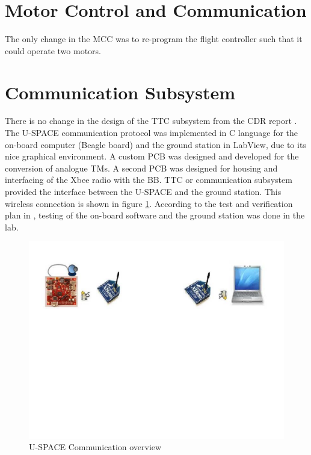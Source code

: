 \section{Motor Control and Communication}
%
The only change in the \ac{MCC} was to re-program the flight controller such that it could operate two motors. 
%
%


\section{Communication Subsystem}
\label{sec:com}
There is no change in the design of the \ac{TTC} subsystem from the CDR report \cite{CDR_TTC}. The \ac{U-SPACE} communication protocol was implemented in C language for the on-board computer (Beagle board) and the ground station in LabView, due to its nice graphical environment. A custom \ac{PCB} was designed and developed for the conversion of analogue \acp{TM}. A second \ac{PCB} was designed for housing and interfacing of the Xbee radio with the \ac{BB}. \ac{TTC} or communication subsystem provided the interface between the \ac{U-SPACE} and the ground station. This wireless connection is shown in figure \ref{fig:com_setup}. According to the test and verification plan in \cite{CDR_TTC}, testing of the on-board software and the ground station was done in the lab.
%
\begin{figure}[bht]
\centering
\includegraphics[scale=0.5]{figures/com_setup.pdf}
\caption[\ac{U-SPACE}Communication overview]{\ac{U-SPACE} Communication overview}
\label{fig:com_setup}
\end{figure}
%
